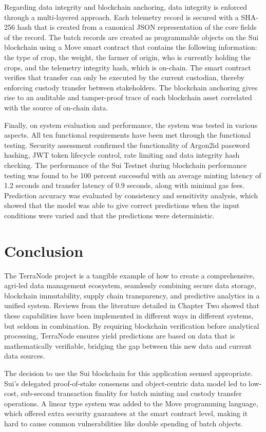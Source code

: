 Regarding data integrity and blockchain anchoring, data integrity is enforced through a multi-layered approach. Each telemetry record is secured with a SHA-256 hash that is created from a canonical JSON representation of the core fields of the record. The batch records are created as programmable objects on the Sui blockchain using a Move smart contract that contains the following information: the type of crop, the weight, the farmer of origin, who is currently holding the crops, and the telemetry integrity hash, which is on-chain. The smart contract verifies that transfer can only be executed by the current custodian, thereby enforcing custody transfer between stakeholders. The blockchain anchoring gives rise to an auditable and tamper-proof trace of each blockchain asset correlated with the source of on-chain data.

Finally, on system evaluation and performance, the system was tested in various aspects. All ten functional requirements have been met through the functional testing. Security assessment confirmed the functionality of Argon2id password hashing, JWT token lifecycle control, rate limiting and data integrity hash checking. The performance of the Sui Testnet during blockchain performance testing was found to be 100 percent successful with an average minting latency of 1.2 seconds and transfer latency of 0.9 seconds, along with minimal gas fees. Prediction accuracy was evaluated by consistency and sensitivity analysis, which showed that the model was able to give correct predictions when the input conditions were varied and that the predictions were deterministic.

\section{Conclusion}

The TerraNode project is a tangible example of how to create a comprehensive, agri-led data management ecosystem, seamlessly combining secure data storage, blockchain immutability, supply chain transparency, and predictive analytics in a unified system. Reviews from the literature detailed in Chapter Two showed that these capabilities have been implemented in different ways in different systems, but seldom in combination. By requiring blockchain verification before analytical processing, TerraNode ensures yield predictions are based on data that is mathematically verifiable, bridging the gap between this new data and current data sources.

The decision to use the Sui blockchain for this application seemed appropriate. Sui's delegated proof-of-stake consensus and object-centric data model led to low-cost, sub-second transaction finality for batch minting and custody transfer operations. A linear type system was added to the Move programming language, which offered extra security guarantees at the smart contract level, making it hard to cause common vulnerabilities like double spending of batch objects.

